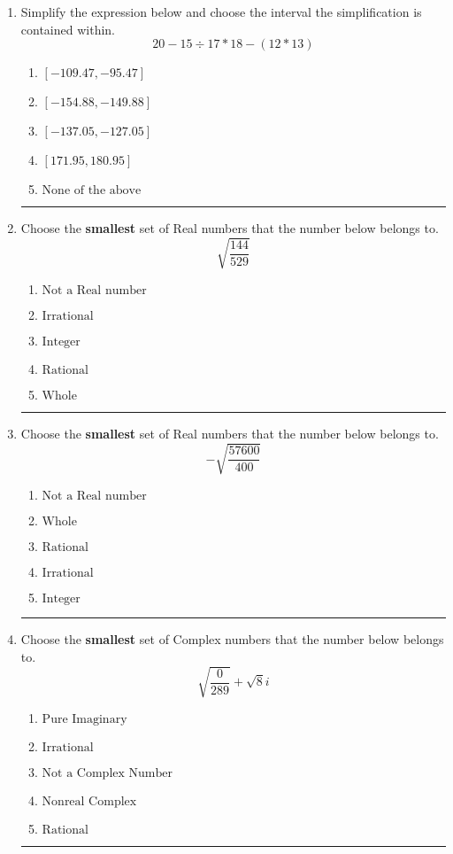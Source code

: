 \documentclass[14pt]{extbook}
\newcommand{\litem}[1]{\item#1\hspace*{-1cm}\rule{\textwidth}{0.4pt}}
\begin{document}
\begin{enumerate}
{\begin{enumerate}[label=\Alph*.]
\end{enumerate} }
\litem{
Simplify the expression below and choose the interval the simplification is contained within.\[ 20 - 15 \div 17 * 18 - (12 * 13) \]\begin{enumerate}[label=\Alph*.]
\item \( [-109.47, -95.47] \)
\item \( [-154.88, -149.88] \)
\item \( [-137.05, -127.05] \)
\item \( [171.95, 180.95] \)
\item \( \text{None of the above} \)

\end{enumerate} }
\litem{
Choose the \textbf{smallest} set of Real numbers that the number below belongs to.\[ \sqrt{\frac{144}{529}} \]\begin{enumerate}[label=\Alph*.]
\item \( \text{Not a Real number} \)
\item \( \text{Irrational} \)
\item \( \text{Integer} \)
\item \( \text{Rational} \)
\item \( \text{Whole} \)

\end{enumerate} }
\litem{
Choose the \textbf{smallest} set of Real numbers that the number below belongs to.\[ -\sqrt{\frac{57600}{400}} \]\begin{enumerate}[label=\Alph*.]
\item \( \text{Not a Real number} \)
\item \( \text{Whole} \)
\item \( \text{Rational} \)
\item \( \text{Irrational} \)
\item \( \text{Integer} \)

\end{enumerate} }
\litem{
Choose the \textbf{smallest} set of Complex numbers that the number below belongs to.\[ \sqrt{\frac{0}{289}}+\sqrt{8}i \]\begin{enumerate}[label=\Alph*.]
\item \( \text{Pure Imaginary} \)
\item \( \text{Irrational} \)
\item \( \text{Not a Complex Number} \)
\item \( \text{Nonreal Complex} \)
\item \( \text{Rational} \)


\end{enumerate}}
\end{enumerate}
\end{document}
